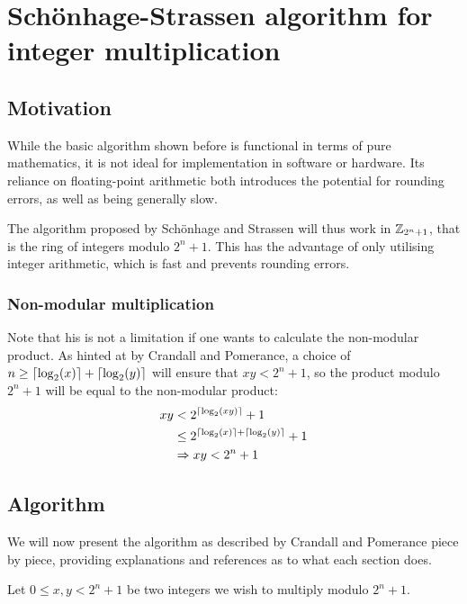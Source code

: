\chapter{Schönhage-Strassen algorithm for integer multiplication}
\label{chapter:schoenhage_strassen}

\section{Motivation}

While the basic algorithm shown before is functional in terms of pure
mathematics, it is not ideal for implementation in software or hardware. Its
reliance on floating-point arithmetic both introduces the potential for
rounding errors, as well as being generally slow.

The algorithm proposed by Schönhage and Strassen will thus work in
$\mathbb{Z}_{2^n + 1}$, that is the ring of integers modulo $2^n + 1$. This has
the advantage of only utilising integer arithmetic, which is fast and prevents
rounding errors.

\subsection{Non-modular multiplication}

Note that his is not a limitation if one wants to calculate the non-modular
product. As hinted at by Crandall and Pomerance,
\autocite{crandallPrimeNumbersComputational2005} a choice of $n \geq
\lceil\log_2(x)\rceil + \lceil\log_2(y)\rceil$ will ensure that $xy < 2^n + 1$, so the
product modulo $2^n + 1$ will be equal to the non-modular product:
\begin{align*}
		xy & < 2^{\lceil\log_2(xy)\rceil} + 1 \\
		   & \leq 2^{\lceil\log_2(x)\rceil + \lceil\log_2(y)\rceil} + 1 \\
		   & \Rightarrow xy < 2^n + 1
\end{align*}

\section{Algorithm}

We will now present the algorithm as described by Crandall and Pomerance
\autocite{crandallPrimeNumbersComputational2005} piece by piece, providing
explanations and references as to what each section does.

Let $0 \leq x, y < 2^n + 1$ be two integers we wish to multiply modulo $2^n +
1$.

